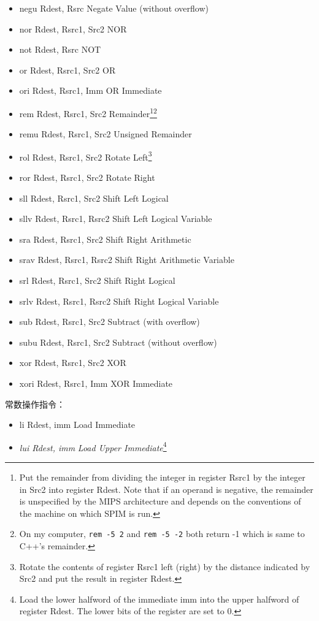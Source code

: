 \documentclass[a4paper, 11pt]{article}
\begin{document}
\begin{itemize}
		\item negu Rdest, Rsrc	\hfill Negate Value (without overflow)
		\item nor Rdest, Rsrc1, Src2	\hfill NOR
		\item not Rdest, Rsrc	\hfill NOT
		\item or Rdest, Rsrc1, Src2	\hfill OR
		\item ori Rdest, Rsrc1, Imm	OR \hfill Immediate
		\item rem Rdest, Rsrc1, Src2	\hfill Remainder\footnote{Put the remainder from dividing the integer in register Rsrc1 by the integer in Src2 into register Rdest. Note that if an operand is negative, the remainder is unspecified by the MIPS architecture and depends on the conventions of the machine on which SPIM is run.}\footnote{On my computer, \texttt{rem -5 2} and \texttt{rem -5 -2}  both return -1 which is same to C++'s remainder.}
		\item remu Rdest, Rsrc1, Src2	\hfill Unsigned Remainder
		\item rol Rdest, Rsrc1, Src2	\hfill Rotate Left\footnote{Rotate the contents of register Rsrc1 left (right) by the distance indicated by Src2 and put the result in register Rdest.}
		\item ror Rdest, Rsrc1, Src2	\hfill Rotate Right

		\item sll Rdest, Rsrc1, Src2	\hfill Shift Left Logical
		\item sllv Rdest, Rsrc1, Rsrc2	\hfill Shift Left Logical Variable
		\item sra Rdest, Rsrc1, Src2	\hfill Shift Right Arithmetic
		\item srav Rdest, Rsrc1, Rsrc2	\hfill Shift Right Arithmetic Variable
		\item srl Rdest, Rsrc1, Src2	\hfill Shift Right Logical
		\item srlv Rdest, Rsrc1, Rsrc2	\hfill Shift Right Logical Variable
		\item sub Rdest, Rsrc1, Src2	\hfill Subtract (with overflow)
		\item subu Rdest, Rsrc1, Src2	\hfill Subtract (without overflow)
		\item xor Rdest, Rsrc1, Src2	\hfill XOR
		\item xori Rdest, Rsrc1, Imm	\hfill XOR Immediate
	\end{itemize}
	常数操作指令：
	\begin{itemize}
		\item li Rdest, imm	\hfill Load Immediate
		\item \textit{lui Rdest, imm}	\hfill \textit{Load Upper Immediate}\footnote{Load the lower halfword of the immediate imm into the upper halfword of register Rdest. The lower bits of the register are set to 0.}
	\end{itemize}
\end{document}
